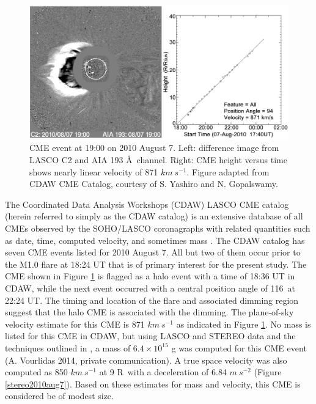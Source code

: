 \begin{figure}[!h]
	\caption[LASCO coronagraph data for 2010 August 7 event]{
        CME event at 19:00 on 2010 August 7. Left: difference image from LASCO C2 and AIA 193 \AA\ channel. 
        Right: CME height versus time shows nearly linear velocity of 871 $km\ s^{-1}$. 
        Figure adapted from CDAW CME Catalog, courtesy of S. Yashiro and N. Gopalswamy.
	}
    \begin{center}
	    \includegraphics[width=150mm]{Images/Lasco2010Aug7Cme.png}
    \end{center}
    \label{lasco2010aug7}
\end{figure}

The Coordinated Data Analysis Workshops (CDAW) LASCO CME catalog (herein referred to simply as the CDAW catalog) is an extensive database of all CMEs observed by the SOHO/LASCO coronagraphs with related quantities such as date, time, computed velocity, and sometimes mass \citep{Gopalswamy2009}. The CDAW catalog has seven CME events listed for 2010 August 7. All but two of them occur prior to the M1.0 flare at 18:24 UT that is of primary interest for the present study. The CME shown in Figure \ref{lasco2010aug7} is flagged as a halo event with a time of 18:36 UT in CDAW, while the next event occurred with a central position angle of 116\degree\ at 22:24 UT. The timing and location of the flare and associated dimming region suggest that the halo CME is associated with the dimming. The plane-of-sky velocity estimate for this CME is 871 $km\ s^{-1}$ as indicated in Figure \ref{lasco2010aug7}. No mass is listed for this CME in CDAW, but using LASCO and STEREO data and the techniques outlined in \citet{Colaninno2009}, a mass of $6.4 \times 10^{15}$ g was computed for this CME event (A. Vourlidas 2014, private communication). A true space velocity was also computed as 850 $km\ s^{-1}$ at 9 R\astrosun\ with a deceleration of 6.84 $m\ s^{-2}$ (Figure \ref{stereo2010aug7}). Based on these estimates for mass and velocity, this CME is
considered be of modest size.

